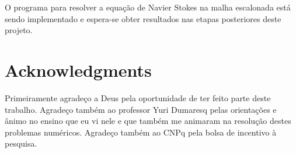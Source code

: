 \documentclass[journal]{IEEEtran}
\begin{document}
O programa para resolver a equação de Navier Stokes na malha escalonada está sendo implementado e espera-se obter resultados nas etapas posteriores deste projeto.

\section*{Acknowledgments}

Primeiramente agradeço a Deus pela oportunidade de ter feito parte deste trabalho. Agradeço também ao professor Yuri Dumaresq pelas orientações e ânimo no ensino que eu vi nele e que também me animaram na resolução destes problemas numéricos. Agradeço também ao CNPq pela bolsa de incentivo à pesquisa.
%



\end{document}
